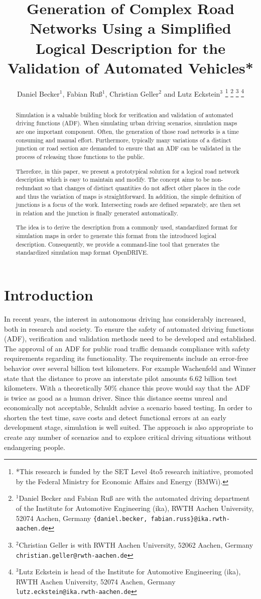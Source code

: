 \documentclass[a4paper, 10pt, conference]{ieeeconf}      %
\title{\LARGE \bf
Generation of Complex Road Networks Using a Simplified Logical Description for the Validation of Automated Vehicles*
}
\author{Daniel Becker$^{1}$, Fabian Ru{\ss}$^{1}$, Christian Geller$^2$ and Lutz Eckstein$^{3}$%
\thanks{*This research is funded by the SET Level 4to5 research initiative, promoted by the	Federal Ministry for Economic Affairs and Energy (BMWi).}%
\thanks{$^{1}$Daniel Becker and Fabian Ru{\ss} are with the automated driving department of the Institute for Automotive Engineering (ika), RWTH Aachen University, 52074 	Aachen, Germany {\tt\small \{daniel.becker, fabian.russ\}@ika.rwth-aachen.de}}%
\thanks{$^{2}$Christian Geller is with RWTH Aachen University, 52062 Aachen, Germany
	{\tt\small christian.geller@rwth-aachen.de}}%
\thanks{$^{3}$Lutz Eckstein is head of the Institute for Automotive Engineering (ika), RWTH Aachen University, 52074 Aachen, Germany {\tt\small lutz.eckstein@ika.rwth-aachen.de}}%
}
\begin{document}
\maketitle
\thispagestyle{empty}
\pagestyle{empty}

\begin{abstract} %
Simulation is a valuable building block for verification and validation of automated driving functions (ADF). When simulating urban driving scenarios, simulation maps are one important component. Often, the generation of those road networks is a time consuming and manual effort. Furthermore, typically many variations of a distinct junction or road section are demanded to ensure that an ADF can be validated in the process of releasing those functions to the public. 

Therefore, in this paper, we present a prototypical solution for a logical road network description which is easy to maintain and modify. The concept aims to be non-redundant so that changes of distinct quantities do not affect other places in the code and thus the variation of maps is straightforward. In addition, the simple definition of junctions is a focus of the work. Intersecting roads are defined separately, are then set in relation and the junction is finally generated automatically. 

The idea is to derive the description from a commonly used, standardized format for simulation maps in order to generate this format from the introduced logical description. Consequently, we provide a command-line tool that generates the standardized simulation map format OpenDRIVE.

\end{abstract}

\section{Introduction}
In recent years, the interest in autonomous driving has considerably increased, both in research and society. To ensure the safety of automated driving functions (ADF), verification and validation methods need to be developed and established. The approval of an ADF for public road traffic demands compliance with safety requirements regarding its functionality. The requirements include an error-free behavior over several billion test kilometers. For example Wachenfeld and Winner \cite{wachenfeld2016release} state that the distance to prove an interstate pilot amounts 6.62 billion test kilometers. With a theoretically 50\% chance this prove would say that the ADF is twice as good as a human driver. Since this distance seems unreal and economically not acceptable, Schuldt \cite{schuldt2017beitrag} advise a scenario based testing. In order to shorten the test time, save costs and detect functional errors at an early development stage, simulation is well suited. The approach is also appropriate to create any number of scenarios and to explore critical driving situations without endangering people.
\end{document}

